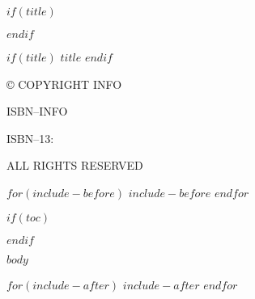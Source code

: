 \documentclass[english,showtrims, 10pt]{memoir}
\date{$date$}
\date{}
\makeatletter
\def\maketitle{%
  \null
  \thispagestyle{empty}%
  \vfill
  \begin{center}\leavevmode
    \normalfont
    {\LARGE\raggedleft \@author\par}%
    \hrulefill\par
    {\huge\raggedright \@title\par}%
    \vskip 1cm
  \end{center}%
  \vfill
  \null
  \cleardoublepage
  }
\makeatother
\begin{document}
 


$if(title)$ \maketitle $endif$ 

\frontmatter

\null\vfill

\begin{flushleft}
$if(title)$ \textit{$title$} $endif$


© \textsc{COPYRIGHT INFO}


ISBN--INFO

ISBN--13: 
\bigskip





\textsc{ALL RIGHTS RESERVED}




\end{flushleft}

$for(include-before)$ $include-before$ $endfor$ 

$if(toc)$ 
\cleardoublepage
\begin{KeepFromToc}
  \tableofcontents
\end{KeepFromToc}
$endif$ 

\mainmatter
\pagestyle{simple}

$body$ 

$for(include-after)$ $include-after$ $endfor$ 
\end{document}
